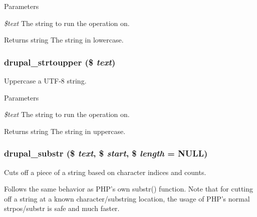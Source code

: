 \begin{DoxyParams}{Parameters}
\item[{\em \$text}]The string to run the operation on.\end{DoxyParams}
\begin{DoxyReturn}{Returns}
string The string in lowercase. 
\end{DoxyReturn}
\hypertarget{group__php__wrappers_ga14c13d4684fa3dbed977bdcbf8f3a5d5}{
\subsubsection[{drupal\_\-strtoupper}]{\setlength{\rightskip}{0pt plus 5cm}drupal\_\-strtoupper (\$ {\em text})}}
\label{group__php__wrappers_ga14c13d4684fa3dbed977bdcbf8f3a5d5}
Uppercase a UTF-\/8 string.


\begin{DoxyParams}{Parameters}
\item[{\em \$text}]The string to run the operation on.\end{DoxyParams}
\begin{DoxyReturn}{Returns}
string The string in uppercase. 
\end{DoxyReturn}
\hypertarget{group__php__wrappers_gabe05f7e9107211f3ad82b564b1d7d598}{
\subsubsection[{drupal\_\-substr}]{\setlength{\rightskip}{0pt plus 5cm}drupal\_\-substr (\$ {\em text}, \/  \$ {\em start}, \/  \$ {\em length} = {\ttfamily NULL})}}
\label{group__php__wrappers_gabe05f7e9107211f3ad82b564b1d7d598}
Cuts off a piece of a string based on character indices and counts.

Follows the same behavior as PHP's own substr() function. Note that for cutting off a string at a known character/substring location, the usage of PHP's normal strpos/substr is safe and much faster.


